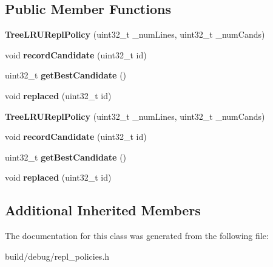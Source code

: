 \subsection*{Public Member Functions}
\begin{DoxyCompactItemize}
\item 
\hypertarget{classTreeLRUReplPolicy_a07468e4e2edb9edd9bc3f29864d63075}{{\bfseries Tree\-L\-R\-U\-Repl\-Policy} (uint32\-\_\-t \-\_\-num\-Lines, uint32\-\_\-t \-\_\-num\-Cands)}\label{classTreeLRUReplPolicy_a07468e4e2edb9edd9bc3f29864d63075}

\item 
\hypertarget{classTreeLRUReplPolicy_adb6bc8ec56424ee471f3c06ce13fab50}{void {\bfseries record\-Candidate} (uint32\-\_\-t id)}\label{classTreeLRUReplPolicy_adb6bc8ec56424ee471f3c06ce13fab50}

\item 
\hypertarget{classTreeLRUReplPolicy_a5fefd60405b952899c288bdcda374d88}{uint32\-\_\-t {\bfseries get\-Best\-Candidate} ()}\label{classTreeLRUReplPolicy_a5fefd60405b952899c288bdcda374d88}

\item 
\hypertarget{classTreeLRUReplPolicy_a9b61f58c5e24ad304fcb4ca005160f24}{void {\bfseries replaced} (uint32\-\_\-t id)}\label{classTreeLRUReplPolicy_a9b61f58c5e24ad304fcb4ca005160f24}

\item 
\hypertarget{classTreeLRUReplPolicy_a07468e4e2edb9edd9bc3f29864d63075}{{\bfseries Tree\-L\-R\-U\-Repl\-Policy} (uint32\-\_\-t \-\_\-num\-Lines, uint32\-\_\-t \-\_\-num\-Cands)}\label{classTreeLRUReplPolicy_a07468e4e2edb9edd9bc3f29864d63075}

\item 
\hypertarget{classTreeLRUReplPolicy_adb6bc8ec56424ee471f3c06ce13fab50}{void {\bfseries record\-Candidate} (uint32\-\_\-t id)}\label{classTreeLRUReplPolicy_adb6bc8ec56424ee471f3c06ce13fab50}

\item 
\hypertarget{classTreeLRUReplPolicy_a5fefd60405b952899c288bdcda374d88}{uint32\-\_\-t {\bfseries get\-Best\-Candidate} ()}\label{classTreeLRUReplPolicy_a5fefd60405b952899c288bdcda374d88}

\item 
\hypertarget{classTreeLRUReplPolicy_a9b61f58c5e24ad304fcb4ca005160f24}{void {\bfseries replaced} (uint32\-\_\-t id)}\label{classTreeLRUReplPolicy_a9b61f58c5e24ad304fcb4ca005160f24}

\end{DoxyCompactItemize}
\subsection*{Additional Inherited Members}


The documentation for this class was generated from the following file\-:\begin{DoxyCompactItemize}
\item 
build/debug/repl\-\_\-policies.\-h\end{DoxyCompactItemize}
